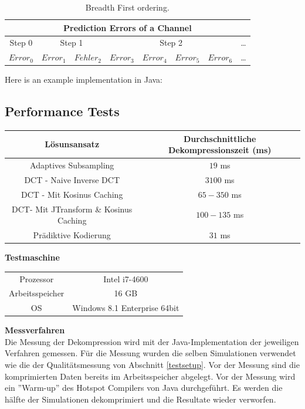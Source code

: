 \begin{table}[!htbp]
	\center
	\begin{tabular}{|c||c|c||c|c|c|c||c}
		\hline
		\multicolumn{8}{|c|}{Prediction Errors of a Channel}\\\hline\hline
		 Step 0& \multicolumn{2}{|c||}{Step 1} & \multicolumn{4}{|c||}{Step 2} &\ldots \\\hline
		$Error_0$ & $Error_1$ &$Fehler_2$ &$Error_3$ & $Error_4$ & $Error_5$ & $Error_6$   & \ldots \\\hline
	\end{tabular}
	\caption{Breadth First ordering.}
	\label{anhang:prediction:breath}
\end{table}
\pagebreak
Here is an example implementation in Java:

\pagebreak

\subsection{Performance Tests} \label{anhang:performance}
\begin{table}[!htbp]
\center
\begin{tabular}{c|c}
	Lösunsansatz & Durchschnittliche Dekompressionszeit (ms) \\\hline
	Adaptives Subsampling & $19$ ms \\
	DCT - Naive Inverse DCT & $3100$ ms \\
	DCT - Mit Kosinus Caching & $65-350$ ms\\
	DCT- Mit JTransform \& Kosinus Caching & $100-135$ ms\\
	Prädiktive Kodierung & $31$ ms\\
\end{tabular}
\end{table}

\textbf{Testmaschine}
\begin{table}[!htbp]
\begin{tabular}{c|c}
	Prozessor & Intel i7-4600 \\
	Arbeitsspeicher & 16 GB \\
	OS & Windows 8.1 Enterprise 64bit \\
\end{tabular}
\end{table}

\textbf{Messverfahren}\\
Die Messung der Dekompression wird mit der Java-Implementation der jeweiligen Verfahren gemessen. Für die Messung wurden die selben Simulationen verwendet wie die der Qualitätsmessung von Abschnitt \ref{testsetup}. Vor der Messung sind die komprimierten Daten bereits im Arbeitsspeicher abgelegt. Vor der Messung wird ein ''Warm-up'' des Hotspot Compilers von Java durchgeführt. Es werden die hälfte der Simulationen dekomprimiert und die Resultate wieder verworfen.